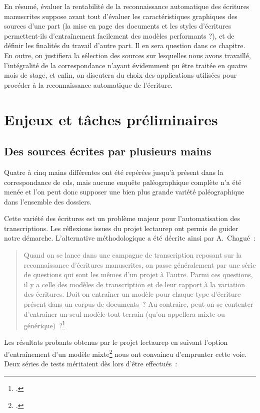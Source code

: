 \documentclass[a4paper,12pt,twoside]{book}
\begin{document}
			En résumé, évaluer la rentabilité de la reconnaissance automatique des écritures manuscrites suppose avant tout d'évaluer les caractéristiques graphiques des sources d'une part (la mise en page des documents et les styles d'écritures permettent-ils d'entraînement facilement des modèles performants ?), et de définir les finalités du travail d'autre part. Il en sera question dans ce chapitre. En outre, on justifiera la sélection des sources sur lesquelles nous avons travaillé, l'intégralité de la correspondance n'ayant évidemment pu être traitée en quatre mois de stage, et enfin, on discutera du choix des applications utilisées pour procéder à la reconnaissance automatique de l'écriture.
		
		\section{Enjeux et tâches préliminaires}
			
			\subsection{Des sources écrites par plusieurs mains}
				Quatre à cinq mains différentes ont été repérées jusqu'à présent dans la correspondance de \gls{cds}, mais aucune enquête paléographique complète n'a été menée et l'on peut donc supposer une bien plus grande variété paléographique dans l'ensemble des dossiers.
				
				Cette variété des écritures est un problème majeur pour l'automatisation des transcriptions. Les réflexions issues du projet \gls{lectaurep} ont permis de guider notre démarche. L'alternative méthodologique a été décrite ainsi par A.~Chagué~:
				
				\begin{quotation}
					Quand on se lance dans une campagne de transcription reposant sur la reconnaissance d’écritures manuscrites, on passe généralement par une série de questions qui sont les mêmes d’un projet à l’autre. Parmi ces questions, il y a celle des modèles de transcription et de leur rapport à la variation des écritures. Doit-on entraîner un modèle pour chaque type d’écriture présent dans un corpus de documents~? Au contraire, peut-on se contenter d’entraîner un seul modèle tout terrain (qu’on appellera mixte ou générique)~?\footcite{chagueCreationModelesTranscription}
				\end{quotation}
			
				Les résultats probants obtenus par le projet \gls{lectaurep} en suivant l'option d'entraînement d'un modèle mixte\footcite{chagueCreationModelesTranscriptiona} nous ont convaincu d'emprunter cette voie. Deux séries de tests méritaient dès lors d'être effectués~:
		
\end{document}
